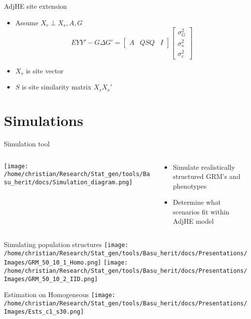 \documentclass[
  ignorenonframetext,
]{beamer}
\begin{document}
\begin{frame}{AdjHE site extension}
\begin{itemize}
	\item Assume $X_c \perp X_s, A, G$
	$$	EYY' - G\Delta G' = 
	\begin{bmatrix}
	A & QSQ & I
	\end{bmatrix}\begin{bmatrix}
	\sigma_G^2 \\ \sigma_s^2 \\ \sigma_e^2
	\end{bmatrix}$$
	\item $X_s$ is site vector
	\item $S$ is site similarity matrix $X_sX_s'$
	\end{itemize}
\end{frame}


\section{Simulations}
\begin{frame}{Simulation tool}
\begin{columns}
\begin{column}{0.7\textwidth}
\texttt{[image: /home/christian/Research/Stat\_gen/tools/Basu\_herit/docs/Simulation\_diagram.png]}
\end{column}
\begin{column}{0.3\textwidth}
\begin{itemize}
	\item Simulate realistically structured GRM's and phenotypes
	\item Determine what scenarios fit within AdjHE model
\end{itemize}
\end{column}
\end{columns}
\end{frame}


\begin{frame}{Simulating population structures}
\texttt{[image: /home/christian/Research/Stat\_gen/tools/Basu\_herit/docs/Presentations/Images/GRM\_50\_10\_1\_Homo.png]}
\texttt{[image: /home/christian/Research/Stat\_gen/tools/Basu\_herit/docs/Presentations/Images/GRM\_50\_10\_2\_IID.png]}
\end{frame}


\begin{frame}{Estimation on Homogeneous}
\centering
\texttt{[image: /home/christian/Research/Stat\_gen/tools/Basu\_herit/docs/Presentations/Images/Ests\_c1\_s30.png]}
\end{frame}
\end{document}
